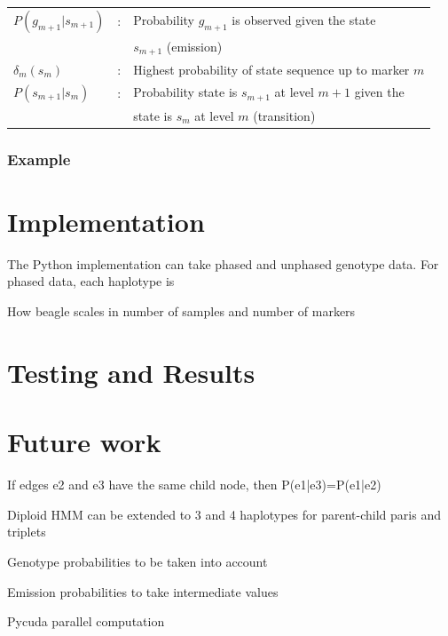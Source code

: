 \documentclass[a4paper,11pt,twoside,abstraction,titlepage]{article}
\begin{document}
\begin{framed}
\begin{tabular}{lll}
\hspace{-20pt} $P(g_{m+1}|s_{m+1})$ &:& \hspace{-5pt} Probability $g_{m+1}$ is observed given the state \\
&& $s_{m+1}$ (emission) \\
\hspace{-20pt}  $\delta_m(s_m)$ &:& \hspace{-5pt} Highest probability of state sequence up to marker $m$ \\ 
\hspace{-20pt} $P(s_{m+1}|s_m)$ &:& Probability state is $s_{m+1}$ at level $m+1$ given the \\
&& state is $s_m$ at level $m$ (transition)
\end{tabular}
\end{framed}

\newpage
\subsubsection{Example}

\newpage
\section{Implementation}
The Python implementation can take phased and unphased genotype data.  For phased data, each haplotype is 

How beagle scales in number of samples and number of markers

\newpage
\section{Testing and Results}


\newpage
\section{Future work}
If edges e2 and e3 have the same child node, then P(e1|e3)=P(e1|e2)

Diploid HMM can be extended to 3 and 4 haplotypes for parent-child paris and triplets

Genotype probabilities to be taken into account

Emission probabilities to take intermediate values

Pycuda parallel computation
\end{document}
